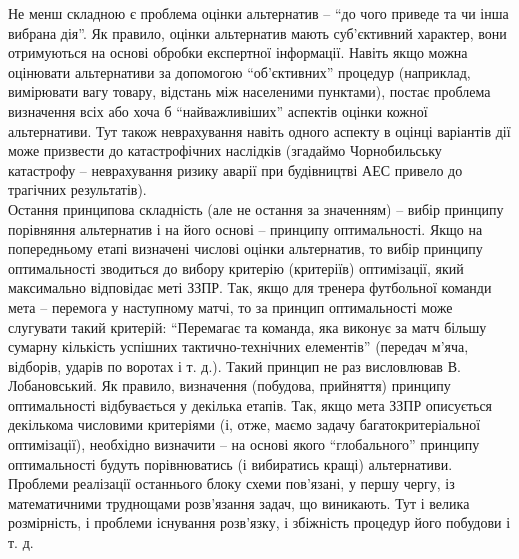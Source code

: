 Не менш складною є проблема оцінки альтернатив -- ``до чого приведе та чи інша вибрана дія''. Як правило, оцінки альтернатив мають суб'єктивний характер, вони отримуються на основі обробки експертної інформації. Навіть якщо можна оцінювати альтернативи за допомогою ``об'єктивних'' процедур (наприклад, вимірювати вагу товару, відстань між населеними пунктами), постає проблема визначення всіх або хоча б ``найважливіших'' аспектів оцінки кожної альтернативи. Тут також неврахування навіть одного аспекту в оцінці варіантів дії може призвести до катастрофічних наслідків (згадаймо Чорнобильську катастрофу -- неврахування ризику аварії при будівництві
АЕС привело до трагічних результатів). \\

Остання принципова складність (але не остання за значенням) -- вибір принципу порівняння альтернатив і на його основі -- принципу оптимальності. Якщо на попередньому етапі визначені числові оцінки альтернатив, то вибір принципу оптимальності зводиться до вибору критерію (критеріїв) оптимізації, який максимально відповідає меті ЗЗПР. Так, якщо для тренера футбольної команди мета -- перемога у наступному матчі, то за принцип оптимальності може слугувати такий критерій: ``Перемагає та команда, яка виконує за матч більшу сумарну кількість успішних тактично-технічних елементів'' (передач м'яча, відборів, ударів по воротах і т. д.). Такий принцип не раз висловлював В. Лобановський. Як правило, визначення (побудова, прийняття) принципу оптимальності відбувається у декілька етапів. Так, якщо мета ЗЗПР описується декількома числовими критеріями (і, отже, маємо задачу багатокритеріальної оптимізації), необхідно визначити -- на основі якого ``глобального'' принципу оптимальності будуть порівнюватись (і вибиратись кращі) альтернативи. \\

Проблеми реалізації останнього блоку схеми пов'язані, у першу чергу, із математичними труднощами розв'язання задач, що виникають. Тут і велика розмірність, і проблеми існування розв'язку, і збіжність процедур його побудови і т. д. \\

